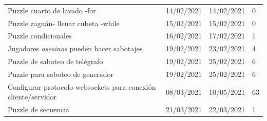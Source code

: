 \begin{longtable}[c]{m{} m{} m{} m{}}
        Puzzle cuarto de lavado -for & 14/02/2021 & 14/02/2021 & 0 \\  
        Puzzle zaguán- llenar cubeta -while & 15/02/2021 & 15/02/2021 & 0 \\ 
        Puzzle condicionales & 16/02/2021 & 17/02/2021 & 1 \\  
        Jugadores \textit{asesinos} pueden hacer sabotajes & 19/02/2021 & 23/02/2021 & 4 \\  
        Puzzle de saboteo de telégrafo & 19/02/2021 & 25/02/2021 & 6 \\  
        Puzzle para saboteo de generador & 19/02/2021 & 25/02/2021 & 6 \\  
        Configurar protocolo websockets para conexión cliente/servidor & 08/03/2021 & 10/05/2021 & 63 \\  
        Puzzle de secuencia & 21/03/2021 & 22/03/2021 & 1 \\  

\end{longtable}
